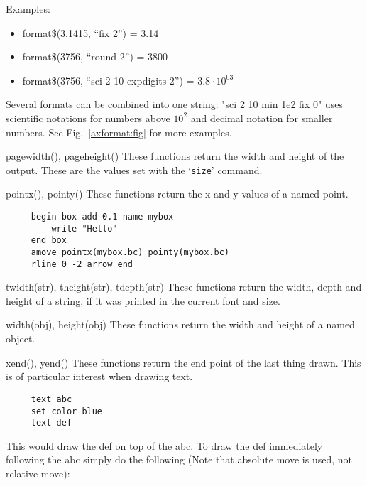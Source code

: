 \begin{commanddescription}
Examples:
\begin{itemize}
\item format\$(3.1415, ``fix 2'') = 3.14
\item format\$(3756, ``round 2'') = 3800
\item format\$(3756, ``sci 2 10 expdigits 2'') = $3.8\cdot10^{03}$
\end{itemize}

Several formats can be combined into one string: "sci 2 10 min 1e2 fix 0" uses scientific notations for numbers above $10^2$ and decimal notation for smaller numbers. See Fig.~\ref{axformat:fig} for more examples.

\item[{\sf pagewidth(), pageheight()}]
 
These functions return the width and height of the output. These are the values set with the `\texttt{size}' command.

\item[{\sf pointx(), pointy()}]\label{fct:pointxy}
These functions return the x and y values of a named point.

\preglecode{}
\begin{Verbatim}
     begin box add 0.1 name mybox
         write "Hello"
     end box
     amove pointx(mybox.bc) pointy(mybox.bc)
     rline 0 -2 arrow end
\end{Verbatim}
\postglecode{}

\item[{\sf twidth(str), theight(str), tdepth(str)}]
 
These functions return the width, depth and height of a string, if it was
printed in the current font and size.

\item[{\sf width(obj), height(obj)}]\label{fct:wdhi}
 
These functions return the width and height of a named object.

\item[{\sf xend(), yend()}]
 
These functions return the end point of the last thing drawn. This is
of particular interest when drawing text.

\preglecode{}
\begin{Verbatim}
     text abc
     set color blue
     text def
\end{Verbatim}
\postglecode{}

This would draw the {\sf def} on top of the {\sf abc}.  To draw the {\sf def}
immediately following the {\sf abc} simply do the following (Note that
absolute move is used, not relative move):


\end{commanddescription}
